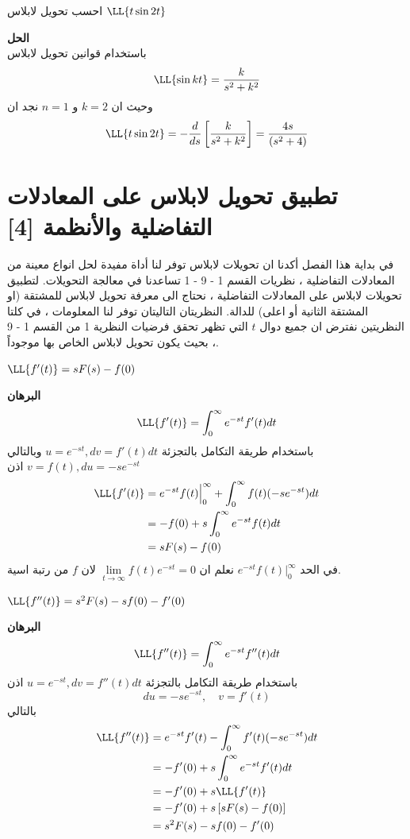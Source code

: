   \begin{example}
  	احسب تحويل لابلاس $\LL\{t\sin 2t\}$
  \end{example}
  \noindent
  \textbf{الحل}\\
  \noindent
  باستخدام قوانين تحويل لابلاس
  \[
  \LL\{\sin kt\} = \frac{k}{s^2 + k^2}
   \]
   وحيث ان $k=2$ و $n=1$ نجد ان
   \[
   \LL\{t\sin 2t\} = -\frac{d}{ds}\left[\frac{k}{s^2 + k^2}\right] = \frac{4s}{(s^2 + 4)}
   \]
   \section[تطبيق تحويل لابلاس على المعادلات التفاضلية والانظمة]{ تطبيق تحويل لابلاس على المعادلات التفاضلية والأنظمة [4]}
   في بداية هذا الفصل أكدنا ان تحويلات لابلاس توفر لنا أداة مفيدة لحل انواع معينة من المعادلات التفاضلية ، نظريات القسم 1 - 9 - 1 تساعدنا في معالجة التحويلات. لتطبيق تحويلات لابلاس على المعادلات التفاضلية ، نحتاج الى معرفة تحويل لابلاس للمشتقة (او المشتقة الثانية أو اعلى) للدالة. النظريتان التاليتان توفر لنا المعلومات ، في كلتا النظريتين نفترض ان جميع دوال $t$ التي تظهر تحقق فرضيات النظرية 1 من القسم 1 - 9 ، بحيث يكون تحويل لابلاس الخاص بها موجوداً.
   
   \begin{theorem}[{[7]}]
   	$\LL\{f'(t)\} = sF(s) - f(0)$
   \end{theorem}
   \noindent
   \textbf{البرهان}
   \[
   \LL\{f'(t)\} = \int_{0}^{\infty} e^{-st} f'(t)dt
   \]
   باستخدام طريقة التكامل بالتجزئة $u=e^{-st} , dv = f'(t)dt$ وبالتالي
   $v=f(t), du = -se^{-st}$ اذن
   \begin{align*}
   	\LL\{f'(t)\} &= e^{-st} f(t)\Big|^\infty_0 + \int_{0}^{\infty} f(t) (-se^{-st}) dt\\
   	&= -f(0) + s \int_{0}^{\infty} e^{-st} f(t) dt\\
   	&= sF(s) - f(0)
   \end{align*}
   في الحد 
   $e^{-st} f(t)\Big|^\infty_0 $
   نعلم ان 
   $\lim\limits_{t\to \infty} f(t) e^{-st} = 0$ لان $f$ من رتبة اسية.
   
   \begin{theorem}[{[7]}]
   	$\LL\{f''(t)\} = s^2F(s) - sf(0) - f'(0)$ 
   \end{theorem}
   \noindent
   \textbf{البرهان}
   \[
   \LL\{f''(t)\} = \int_{0}^{\infty} e^{-st} f''(t) dt
   \]
   باستخدام طريقة التكامل بالتجزئة 
   $u=e^{-st} , dv = f''(t) dt$ اذن
   \[
   du = -se^{-st}, \quad v= f'(t)
   \]
   بالتالي
   \begin{align*}
   	\LL\{f''(t)\} &= e^{-st} f'(t) - \int_{0}^{\infty} f'(t) (-se^{-st} ) dt\\
   	&= -f'(0) + s \int_{0}^{\infty} e^{-st} f'(t)dt\\
   	&= -f'(0) + s\LL\{f'(t)\}\\
   	&= -f'(0) + s \left[sF(s) - f(0)\right]\\
   	&= s^2F(s) - sf(0) - f'(0)
    \end{align*}
    
